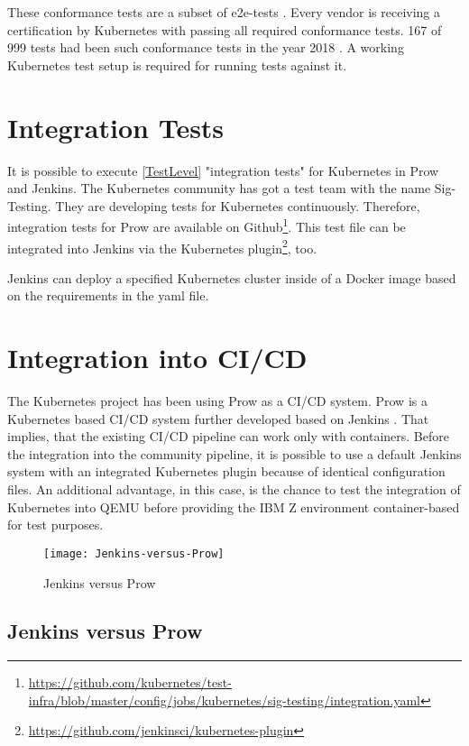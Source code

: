 These conformance tests are a subset of e2e-tests \cite[~p.8]{Omichi2018}. Every vendor is receiving a certification by Kubernetes with passing all required conformance tests. 167 of 999 tests had been such conformance tests in the year 2018 \cite[~p.9]{Omichi2018}.
A working Kubernetes test setup is required for running tests against it.


\section{Integration Tests} \label{Kub-IntegrationTest}

It is possible to execute \ref{TestLevel} "integration tests" for Kubernetes in Prow and Jenkins.
The Kubernetes community has got a test team with the name Sig-Testing. They are developing tests for Kubernetes continuously. Therefore, integration tests for Prow are available on Github\footnote{\url{https://github.com/kubernetes/test-infra/blob/master/config/jobs/kubernetes/sig-testing/integration.yaml}}. This test file can be integrated into Jenkins via the Kubernetes plugin\footnote{\url{https://github.com/jenkinsci/kubernetes-plugin}}, too.

Jenkins can deploy a specified Kubernetes cluster inside of a Docker image based on the requirements in the yaml file.

\section{Integration into CI/CD}

The Kubernetes project has been using Prow as a \gls{CI/CD} system. Prow is a Kubernetes based \gls{CI/CD} system further developed based on Jenkins \cite{JAXenter}. That implies, that the existing \gls{CI/CD} pipeline can work only with containers.
Before the integration into the community pipeline, it is possible to use a default Jenkins system with an integrated Kubernetes plugin because of identical configuration files. An additional advantage, in this case, is the chance to test the integration of Kubernetes into \gls{QEMU} before providing the IBM Z environment container-based for test purposes.

\begin{figure}[H]
\centering
\texttt{[image: Jenkins-versus-Prow]}
 \caption{Jenkins versus Prow}
    \label{JenkinsProw}
\end{figure}


\subsection{Jenkins versus Prow}

